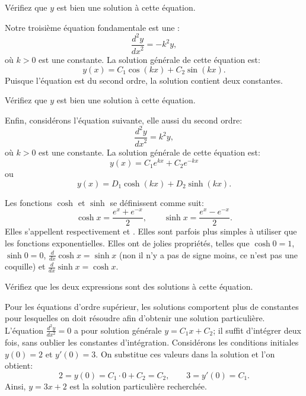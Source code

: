 \begin{exercise}
	Vérifiez que $y$ est bien une solution à cette équation.
\end{exercise}

Notre troisième équation fondamentale est une
\emph{}:
\begin{equation*}
	\frac{d^2y}{{dx}^2} = -k^2 y,
\end{equation*}
où $k > 0$ est une constante. La solution générale de cette équation est:
\begin{equation*}
	y(x) = C_1 \cos(kx) + C_2 \sin(kx).
\end{equation*}
Puisque l'équation est du second ordre, la solution contient deux constantes.

\begin{exercise}
	Vérifiez que $y$ est bien une solution à cette équation.
\end{exercise}

Enfin, considérons l'équation suivante, elle aussi du second ordre:
\begin{equation*}
	\frac{d^2y}{{dx}^2} = k^2 y,
\end{equation*}
où $k > 0$ est une constante. La solution générale de cette équation est:
\begin{equation*}
	y(x) = C_1 e^{kx} + C_2 e^{-kx}
\end{equation*}
ou
\begin{equation*}
	y(x) = D_1 \cosh(kx) + D_2 \sinh(kx) .
\end{equation*}

Les fonctions $\cosh$ et $\sinh$ se définissent comme suit:
\begin{equation*}
	\cosh x = \frac{e^{x} + e^{-x}}{2} , \qquad
	\sinh x = \frac{e^{x} - e^{-x}}{2} .
\end{equation*}
Elles s'appellent respectivement \emph{}
et \emph{}.
Elles sont parfois plus simples à utiliser que les fonctions exponentielles.  Elles ont de jolies propriétés, telles que
$\cosh 0 = 1$, $\sinh 0 = 0$, $\frac{d}{dx} \cosh x = \sinh x$
(non il n'y a pas de signe moins, ce n'est pas une coquille)
et $\frac{d}{dx} \sinh x = \cosh x$.

\begin{exercise}
	Vérifiez que les deux expressions sont des solutions à cette équation.
\end{exercise}

\begin{example}
	Pour les équations d'ordre supérieur, les solutions comportent plus de constantes pour lesquelles
	on doit résoudre afin d'obtenir une solution particulière.
	L'équation  $\frac{d^2y}{dx^2} = 0$ a pour solution générale $y = C_1 x + C_2$;
	il suffit d'intégrer deux fois, sans oublier les constantes d'intégration.
	Considérons les conditions initiales $y(0) = 2$ et $y'(0) = 3$.
	On substitue ces valeurs dans la solution et l'on obtient:
	\begin{equation*}
		2 = y(0) = C_1 \cdot 0 + C_2 = C_2, \qquad
		3 = y'(0) = C_1 .
	\end{equation*}
	Ainsi, $y = 3x + 2$ est la solution particulière recherchée.
\end{example}

